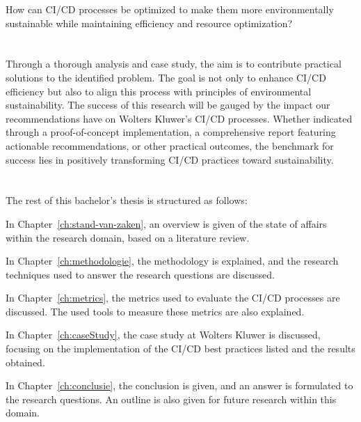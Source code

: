 How can CI/CD processes be optimized to make them more environmentally sustainable while maintaining efficiency
and resource optimization?


\section{}%
\label{sec:onderzoeksdoelstelling}

Through a thorough analysis and case study, the aim is to contribute practical solutions to the identified problem.
The goal is not only to enhance CI/CD efficiency but also to align this process with principles of environmental sustainability.
The success of this research will be gauged by the impact our recommendations have on Wolters Kluwer's CI/CD processes. 
Whether indicated through a proof-of-concept implementation, a comprehensive report featuring actionable recommendations, or other practical outcomes, the benchmark for success lies in positively transforming CI/CD practices toward sustainability.


\section{}%
\label{sec:opzet-bachelorproef}


The rest of this bachelor's thesis is structured as follows:

In Chapter~\ref{ch:stand-van-zaken}, an overview is given of the state of affairs within the research domain, based on a literature review.

In Chapter~\ref{ch:methodologie}, the methodology is explained, and the research techniques used to answer the research questions are discussed.

In Chapter~\ref{ch:metrics}, the metrics used to evaluate the CI/CD processes are discussed. The used tools to measure these metrics are also explained.

In Chapter~\ref{ch:caseStudy}, the case study at Wolters Kluwer is discussed, focusing on the implementation of the CI/CD best practices listed and the results obtained.

In Chapter~\ref{ch:conclusie}, the conclusion is given, and an answer is formulated to the research questions. An outline is also given for future research within this domain.